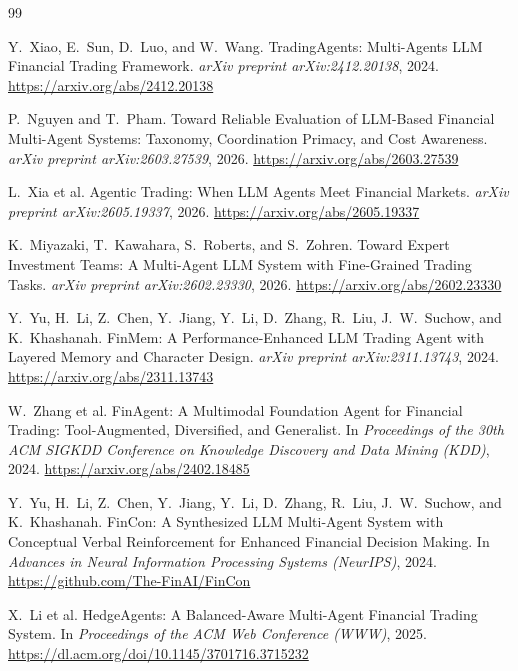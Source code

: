 \documentclass[10pt,a4paper,twocolumn]{article}
\begin{document}
\begin{thebibliography}{99}
\small
\setlength{\itemsep}{1.2pt}

Y.~Xiao, E.~Sun, D.~Luo, and W.~Wang.
\newblock TradingAgents: Multi-Agents LLM Financial Trading Framework.
\newblock \emph{arXiv preprint arXiv:2412.20138}, 2024. \url{https://arxiv.org/abs/2412.20138}

P.~Nguyen and T.~Pham.
\newblock Toward Reliable Evaluation of LLM-Based Financial Multi-Agent Systems: Taxonomy, Coordination Primacy, and Cost Awareness.
\newblock \emph{arXiv preprint arXiv:2603.27539}, 2026. \url{https://arxiv.org/abs/2603.27539}

L.~Xia et al.
\newblock Agentic Trading: When LLM Agents Meet Financial Markets.
\newblock \emph{arXiv preprint arXiv:2605.19337}, 2026. \url{https://arxiv.org/abs/2605.19337}

K.~Miyazaki, T.~Kawahara, S.~Roberts, and S.~Zohren.
\newblock Toward Expert Investment Teams: A Multi-Agent LLM System with Fine-Grained Trading Tasks.
\newblock \emph{arXiv preprint arXiv:2602.23330}, 2026. \url{https://arxiv.org/abs/2602.23330}

Y.~Yu, H.~Li, Z.~Chen, Y.~Jiang, Y.~Li, D.~Zhang, R.~Liu, J.~W.~Suchow, and K.~Khashanah.
\newblock FinMem: A Performance-Enhanced LLM Trading Agent with Layered Memory and Character Design.
\newblock \emph{arXiv preprint arXiv:2311.13743}, 2024. \url{https://arxiv.org/abs/2311.13743}

W.~Zhang et al.
\newblock FinAgent: A Multimodal Foundation Agent for Financial Trading: Tool-Augmented, Diversified, and Generalist.
\newblock In \emph{Proceedings of the 30th ACM SIGKDD Conference on Knowledge Discovery and Data Mining (KDD)}, 2024. \url{https://arxiv.org/abs/2402.18485}

Y.~Yu, H.~Li, Z.~Chen, Y.~Jiang, Y.~Li, D.~Zhang, R.~Liu, J.~W.~Suchow, and K.~Khashanah.
\newblock FinCon: A Synthesized LLM Multi-Agent System with Conceptual Verbal Reinforcement for Enhanced Financial Decision Making.
\newblock In \emph{Advances in Neural Information Processing Systems (NeurIPS)}, 2024. \url{https://github.com/The-FinAI/FinCon}

X.~Li et al.
\newblock HedgeAgents: A Balanced-Aware Multi-Agent Financial Trading System.
\newblock In \emph{Proceedings of the ACM Web Conference (WWW)}, 2025. \url{https://dl.acm.org/doi/10.1145/3701716.3715232}


\end{thebibliography}
\end{document}
